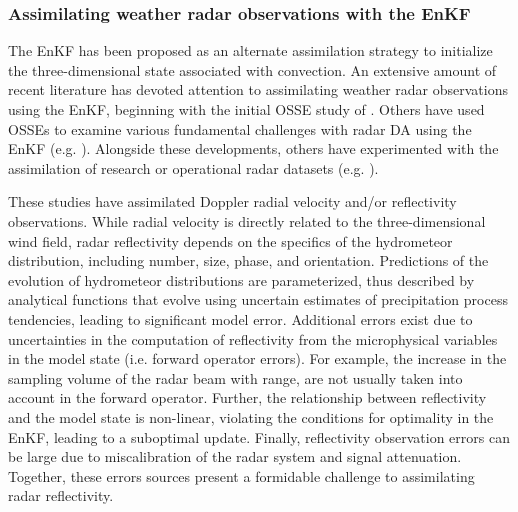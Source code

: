 \subsubsection{Assimilating weather radar observations with the EnKF}
\label{background_radarenkf}
The EnKF has been proposed as an alternate assimilation strategy to initialize the three-dimensional state associated with convection. An extensive amount of recent literature has devoted attention to assimilating weather radar observations using the EnKF, beginning with the initial OSSE study of \citet{snyderzhang03}. Others have used OSSEs to examine various fundamental challenges with radar DA using the EnKF (e.g. \citealt{zhangetal04,tongxue05,cayaetal05,xueetal06,jungetal08a,xuetal08,luxu09,thompsonetal12}). Alongside these developments, others have experimented with the assimilation of research or operational radar datasets (e.g. \citealt{dowelletal04,aksoyetal09,dowellwicker09,dowelletal11,schenkmanetal11,snooketal11,dawsonetal12,jungetal12,tanamachietal13}).

These studies have assimilated Doppler radial velocity and/or reflectivity observations. While radial velocity is directly related to the three-dimensional wind field, radar reflectivity depends on the specifics of the hydrometeor distribution, including number, size, phase, and orientation. Predictions of the evolution of hydrometeor distributions are parameterized, thus described by analytical functions that evolve using uncertain estimates of precipitation process tendencies, leading to significant model error. Additional errors exist due to uncertainties in the computation of reflectivity from the microphysical variables in the model state (i.e. forward operator errors). For example, the increase in the sampling volume of the radar beam with range, are not usually taken into account in the forward operator. Further, the relationship between reflectivity and the model state is non-linear, violating the conditions for optimality in the EnKF, leading to a suboptimal update. Finally, reflectivity observation errors can be large due to miscalibration of the radar system and signal attenuation. Together, these errors sources present a formidable challenge to assimilating radar reflectivity.

